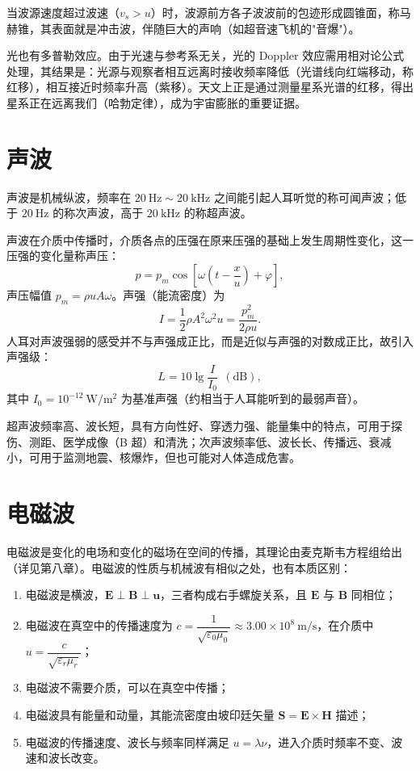     当波源速度超过波速（$v_s>u$）时，波源前方各子波波前的包迹形成圆锥面，称马赫锥，其表面就是冲击波，伴随巨大的声响（如超音速飞机的"音爆"）。

    光也有多普勒效应。由于光速与参考系无关，光的 Doppler 效应需用相对论公式处理，其结果是：光源与观察者相互远离时接收频率降低（光谱线向红端移动，称红移），相互接近时频率升高（紫移）。天文上正是通过测量星系光谱的红移，得出星系正在远离我们（哈勃定律），成为宇宙膨胀的重要证据。


\section{声波}
    声波是机械纵波，频率在 $20\ \mathrm{Hz}\sim20\ \mathrm{kHz}$ 之间能引起人耳听觉的称可闻声波；低于 $20\ \mathrm{Hz}$ 的称次声波，高于 $20\ \mathrm{kHz}$ 的称超声波。

    声波在介质中传播时，介质各点的压强在原来压强的基础上发生周期性变化，这一压强的变化量称声压：
    \[
    p=p_m\cos\left[\omega\left(t-\frac{x}{u}\right)+\varphi\right],
    \]
    声压幅值 $p_m=\rho uA\omega$。声强（能流密度）为
    \[
    I=\frac{1}{2}\rho A^{2}\omega^{2}u=\frac{p_m^{2}}{2\rho u}.
    \]
    人耳对声波强弱的感受并不与声强成正比，而是近似与声强的对数成正比，故引入声强级：
    \[
    L=10\lg\frac{I}{I_0}\ \ (\mathrm{dB}),
    \]
    其中 $I_0=10^{-12}\ \mathrm{W/m^{2}}$ 为基准声强（约相当于人耳能听到的最弱声音）。

    超声波频率高、波长短，具有方向性好、穿透力强、能量集中的特点，可用于探伤、测距、医学成像（B 超）和清洗；次声波频率低、波长长、传播远、衰减小，可用于监测地震、核爆炸，但也可能对人体造成危害。


\section{电磁波}
    电磁波是变化的电场和变化的磁场在空间的传播，其理论由麦克斯韦方程组给出（详见第八章）。电磁波的性质与机械波有相似之处，也有本质区别：
    \begin{enumerate}
        \item 电磁波是横波，$\boldsymbol{E}\perp\boldsymbol{B}\perp\boldsymbol{u}$，三者构成右手螺旋关系，且 $\boldsymbol{E}$ 与 $\boldsymbol{B}$ 同相位；
        \item 电磁波在真空中的传播速度为 $c=\dfrac{1}{\sqrt{\varepsilon_0\mu_0}}\approx3.00\times10^{8}\ \mathrm{m/s}$，在介质中 $u=\dfrac{c}{\sqrt{\varepsilon_r\mu_r}}$；
        \item 电磁波不需要介质，可以在真空中传播；
        \item 电磁波具有能量和动量，其能流密度由坡印廷矢量 $\boldsymbol{S}=\boldsymbol{E}\times\boldsymbol{H}$ 描述；
        \item 电磁波的传播速度、波长与频率同样满足 $u=\lambda\nu$，进入介质时频率不变、波速和波长改变。
    \end{enumerate}

